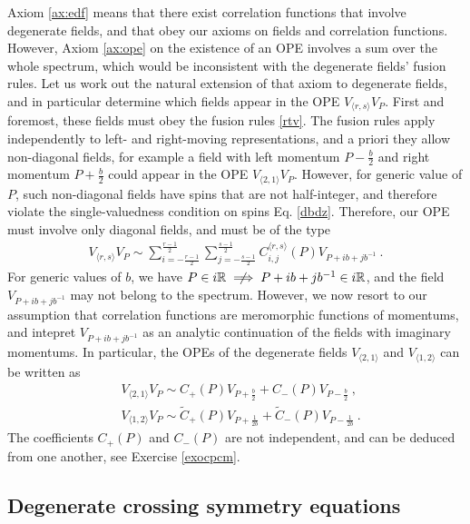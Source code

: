 \documentclass[12pt, a4paper, notitlepage, twoside]{report}
\numberwithin{equation}{section}
\theoremstyle{break}
\begin{document}
Axiom \ref{ax:edf} means that there exist correlation functions that involve degenerate fields, and that obey our axioms on fields and correlation functions. However, Axiom \ref{ax:ope} on the existence of an OPE involves a sum over the whole spectrum, which would be inconsistent with the degenerate fields' fusion rules. 
Let us work out the natural extension of that axiom to degenerate fields, and in particular determine which fields appear in the OPE $V_{\langle r,s \rangle} V_P$. First and foremost, these fields must obey the fusion rules
\eqref{rtv}. The fusion rules apply independently to left- and right-moving representations, and  a priori they allow non-diagonal fields, for example a field with left momentum $P-\frac{b}{2}$ and right momentum $P+\frac{b}{2}$ could appear in the OPE $V_{\langle 2,1\rangle} V_P$. However, for generic value of $P$, such non-diagonal fields have spins that are not half-integer, and therefore violate the single-valuedness condition on spins Eq. \eqref{dbdz}.
Therefore, our OPE must involve only diagonal fields, and must be of the type
\begin{align}
 \boxed{V_{\langle r,s \rangle} V_P \sim \sum_{i=-\frac{r-1}{2}}^{\frac{r-1}{2}} \sum_{j=-\frac{s-1}{2}}^{\frac{s-1}{2}}  C_{i,j}^{\langle r,s \rangle}(P) V_{P + ib+jb^{-1}}}\ .
\label{vrsv}
\end{align}
For generic values of $b$, we have $P\in i\mathbb{R} \centernot\implies P+ib+jb^{-1}\in i\mathbb{R}$, and the field $ V_{P + ib+jb^{-1}}$ may not belong to the spectrum. However, we now resort to our assumption that correlation functions are meromorphic functions of momentums, and intepret $ V_{P + ib+jb^{-1}}$ as an analytic continuation of the fields with imaginary momentums.
In particular, the OPEs of the degenerate fields $V_{\langle 2,1\rangle}$ and $V_{\langle 1,2\rangle}$ can be written as 
\begin{align}
 &\boxed{V_{\langle 2,1 \rangle} V_P \sim C_+(P) V_{P+\frac{b}{2}} + C_-(P) V_{P-\frac{b}{2}}}\ ,
\label{vot}
\\
& \boxed{V_{\langle 1,2 \rangle} V_P \sim \tilde{C}_+(P) V_{P+\frac{1}{2b}} + \tilde{C}_-(P) V_{P-\frac{1}{2b}}}\ .
 \label{vto}
\end{align}
The coefficients $C_+(P)$ and $C_-(P)$ are not independent, and can be deduced from one another, see Exercise \ref{exocpcm}.


\subsection{Degenerate crossing symmetry equations \label{seccbe}}
\end{document}
